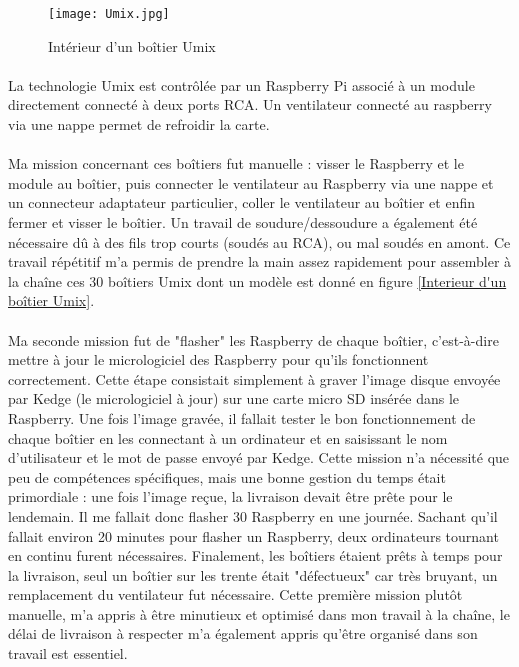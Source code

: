 \documentclass[12pt]{report}
\begin{document}
\begin{figure}[h!]
\begin{center}
\texttt{[image: Umix.jpg]}
\end{center}
\caption{Intérieur d'un boîtier Umix}
\label{Intérieur d'un boîtier Umix}
\end{figure}

\paragraph{}
La technologie Umix est contrôlée par un Raspberry Pi associé à un module directement connecté à deux ports RCA. Un ventilateur connecté au raspberry via une nappe permet de refroidir la carte. 

\paragraph{}
Ma mission concernant ces boîtiers fut manuelle : visser le Raspberry et le module au boîtier, puis connecter le ventilateur au Raspberry via une nappe et un connecteur adaptateur particulier, coller le ventilateur au boîtier et enfin fermer et visser le boîtier. Un travail de soudure/dessoudure a également été nécessaire dû à des fils trop courts (soudés au RCA), ou mal soudés en amont. Ce travail répétitif m'a permis de prendre la main assez rapidement pour assembler à la chaîne ces 30 boîtiers Umix dont un modèle est donné en figure \ref{Interieur d'un boîtier Umix}.  

\paragraph{}
Ma seconde mission fut de "flasher" les Raspberry de chaque boîtier, c'est-à-dire mettre à jour le micrologiciel des Raspberry pour qu'ils fonctionnent correctement. Cette étape consistait simplement à graver l'image disque envoyée par Kedge (le micrologiciel à jour) sur une carte micro SD insérée dans le Raspberry. Une fois l'image gravée, il fallait tester le bon fonctionnement de chaque boîtier en les connectant à un ordinateur et en saisissant le nom d'utilisateur et le mot de passe envoyé par Kedge. 
Cette mission n'a nécessité que peu de compétences spécifiques, mais une bonne gestion du temps était primordiale : une fois l'image reçue, la livraison devait être prête pour le lendemain. Il me fallait donc flasher 30 Raspberry en une journée. Sachant qu'il fallait environ 20 minutes pour flasher un Raspberry, deux ordinateurs tournant en continu furent nécessaires. Finalement, les boîtiers étaient prêts à temps pour la livraison, seul un boîtier sur les trente était "défectueux" car très bruyant, un remplacement du ventilateur fut nécessaire. Cette première mission plutôt manuelle, m'a appris à être minutieux et optimisé dans mon travail à la chaîne, le délai de livraison à respecter m'a également appris qu'être organisé dans son travail est essentiel. 
\end{document}
